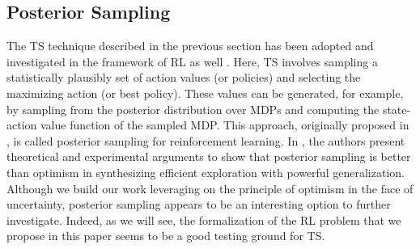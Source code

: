 \subsection{Posterior Sampling}
The \gls{TS} technique described in the previous section has been adopted and investigated in the framework of \gls{RL} as well \cite{strens2000bayesian, osband2013more, osband2015bootstrapped, osband2016deep}. Here, \gls{TS} involves sampling a statistically plausibly set of action values (or policies) and selecting the maximizing action (or best policy). These values can be generated, for example, by sampling from the posterior distribution over MDPs and computing the state-action value function of the sampled MDP. This approach, originally proposed in \cite{strens2000bayesian}, is called posterior sampling for reinforcement learning. In \cite{osband2017posterior}, the authors present theoretical and experimental arguments to show that posterior sampling is better than optimism in synthesizing efficient exploration with powerful generalization. Although we build our work leveraging on the principle of optimism in the face of uncertainty, posterior sampling appears to be an interesting option to further investigate. Indeed, as we will see, the formalization of the \gls{RL} problem that we propose in this paper seems to be a good testing ground for \gls{TS}.